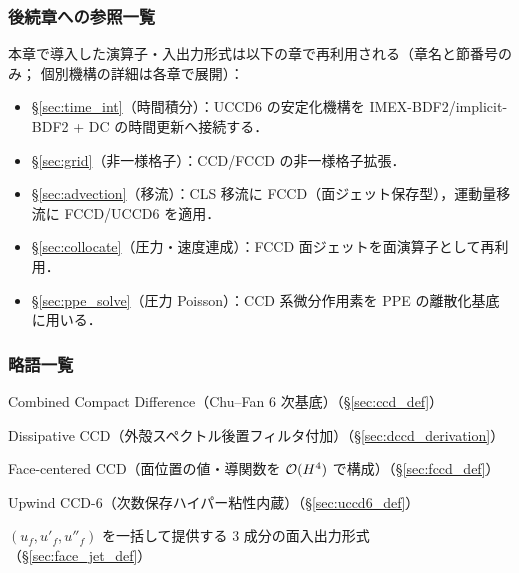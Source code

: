 \subsubsection*{後続章への参照一覧}

本章で導入した演算子・入出力形式は以下の章で再利用される（章名と節番号のみ；
個別機構の詳細は各章で展開）：

\begin{itemize}\setlength{\itemsep}{0pt}
  \item \S\ref{sec:time_int}（時間積分）：UCCD6 の安定化機構を IMEX-BDF2/implicit-BDF2 + DC の時間更新へ接続する．
  \item \S\ref{sec:grid}（非一様格子）：CCD/FCCD の非一様格子拡張．
  \item \S\ref{sec:advection}（移流）：CLS 移流に FCCD（面ジェット保存型），運動量移流に FCCD/UCCD6 を適用．
  \item \S\ref{sec:collocate}（圧力・速度連成）：FCCD 面ジェットを面演算子として再利用．
  \item \S\ref{sec:ppe_solve}（圧力 Poisson）：CCD 系微分作用素を PPE の離散化基底に用いる．
\end{itemize}

\subsubsection*{略語一覧}

\begin{description}\setlength{\itemsep}{0pt}
  \item[CCD] Combined Compact Difference（Chu--Fan 6 次基底）（§\ref{sec:ccd_def}）
  \item[DCCD] Dissipative CCD（外殻スペクトル後置フィルタ付加）（§\ref{sec:dccd_derivation}）
  \item[FCCD] Face-centered CCD（面位置の値・導関数を $\mathcal{O}(H^4)$ で構成）（§\ref{sec:fccd_def}）
  \item[UCCD6] Upwind CCD-6（次数保存ハイパー粘性内蔵）（§\ref{sec:uccd6_def}）
  \item[面ジェット $\FaceJet{u}$] $(u_f, u'_f, u''_f)$ を一括して提供する 3 成分の面入出力形式（§\ref{sec:face_jet_def}）
\end{description}

